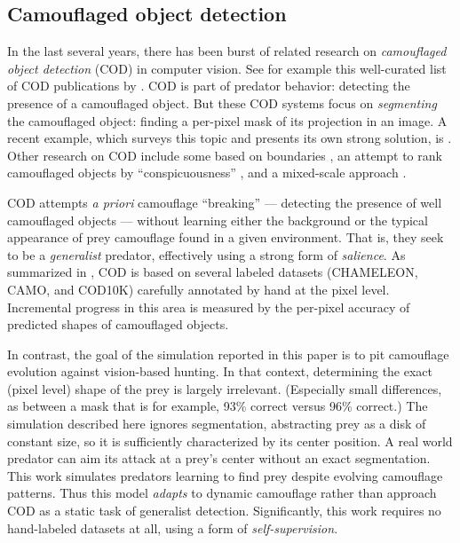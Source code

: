 \documentclass[acmtog]{acmart}
\newcommand{\jargon}[1]{\textit{#1}}
\begin{document}
\subsection{Camouflaged object detection}
In the last several years, there has been burst of related research on \jargon{camouflaged object detection} (COD) in computer vision. See for example this well-curated list of COD publications by \citet{visionxiang_cod}. COD is part of predator behavior: detecting the presence of a camouflaged object. But these COD systems focus on \jargon{segmenting} the camouflaged object: finding a per-pixel mask of its projection in an image. A recent example, which surveys this topic and presents its own strong solution, is \citet{Zhang2022}. Other research on COD include some based on boundaries \cite{chen_boundary-guided_2022} \cite{sun_boundary-guided_2022}, an attempt to rank camouflaged objects by “conspicuousness” \cite{lv_cod_2022}, and a mixed-scale approach \cite{pang_zoom_2022}.
\par
COD attempts \textit{a priori} camouflage “breaking” — detecting the presence of well camouflaged objects — without learning either the background or the typical appearance of prey camouflage found in a given environment. That is, they seek to be a \jargon{generalist} predator, effectively using a strong form of \jargon{salience}. As summarized in \citet{Zhang2022}, COD is based on several labeled datasets (CHAMELEON, CAMO, and COD10K) carefully annotated by hand at the pixel level. Incremental progress in this area is measured by the per-pixel accuracy of predicted shapes of camouflaged objects.
\par
In contrast, the goal of the simulation reported in this paper is to pit camouflage evolution against vision-based hunting. In that context, determining the exact (pixel level) shape of the prey is largely irrelevant. (Especially small differences, as between a mask that is for example, 93\% correct versus 96\% correct.) The simulation described here ignores segmentation, abstracting prey as a disk of constant size, so it is sufficiently characterized by its center position. A real world predator can aim its attack at a prey's center without an exact segmentation. This work simulates predators learning to find prey despite evolving camouflage patterns. Thus this model \jargon{adapts} to dynamic camouflage rather than approach COD as a static task of generalist detection. Significantly, this work requires no hand-labeled datasets at all, using a form of \jargon{self-supervision}.
\par
\end{document}
